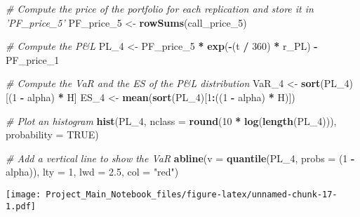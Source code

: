 \documentclass[]{article}
\newenvironment{Shaded}{\begin{snugshade}}{\end{snugshade}}
\newcommand{\CommentTok}[1]{\textcolor[rgb]{0.56,0.35,0.01}{\textit{#1}}}
\newcommand{\DataTypeTok}[1]{\textcolor[rgb]{0.13,0.29,0.53}{#1}}
\newcommand{\DecValTok}[1]{\textcolor[rgb]{0.00,0.00,0.81}{#1}}
\newcommand{\FloatTok}[1]{\textcolor[rgb]{0.00,0.00,0.81}{#1}}
\newcommand{\KeywordTok}[1]{\textcolor[rgb]{0.13,0.29,0.53}{\textbf{#1}}}
\newcommand{\NormalTok}[1]{#1}
\newcommand{\OperatorTok}[1]{\textcolor[rgb]{0.81,0.36,0.00}{\textbf{#1}}}
\newcommand{\OtherTok}[1]{\textcolor[rgb]{0.56,0.35,0.01}{#1}}
\newcommand{\StringTok}[1]{\textcolor[rgb]{0.31,0.60,0.02}{#1}}
\begin{document}
\begin{Shaded}
\begin{Highlighting}[]
\CommentTok{# Compute the price of the portfolio for each replication and store it in 'PF_price_5'}
\NormalTok{PF_price_}\DecValTok{5}\NormalTok{ <-}\StringTok{ }\KeywordTok{rowSums}\NormalTok{(call_price_}\DecValTok{5}\NormalTok{)}

\CommentTok{# Compute the P&L}
\NormalTok{PL_}\DecValTok{4}\NormalTok{ <-}\StringTok{ }\NormalTok{PF_price_}\DecValTok{5} \OperatorTok{*}\StringTok{ }\KeywordTok{exp}\NormalTok{(}\OperatorTok{-}\NormalTok{(t }\OperatorTok{/}\StringTok{ }\DecValTok{360}\NormalTok{) }\OperatorTok{*}\StringTok{ }\NormalTok{r_PL) }\OperatorTok{-}\StringTok{ }\NormalTok{PF_price_}\DecValTok{1}

\CommentTok{# Compute the VaR and the ES of the P&L distribution}
\NormalTok{VaR_}\DecValTok{4}\NormalTok{ <-}\StringTok{ }\KeywordTok{sort}\NormalTok{(PL_}\DecValTok{4}\NormalTok{)[(}\DecValTok{1} \OperatorTok{-}\StringTok{ }\NormalTok{alpha) }\OperatorTok{*}\StringTok{ }\NormalTok{H]}
\NormalTok{ES_}\DecValTok{4}\NormalTok{  <-}\StringTok{ }\KeywordTok{mean}\NormalTok{(}\KeywordTok{sort}\NormalTok{(PL_}\DecValTok{4}\NormalTok{)[}\DecValTok{1}\OperatorTok{:}\NormalTok{((}\DecValTok{1} \OperatorTok{-}\StringTok{ }\NormalTok{alpha) }\OperatorTok{*}\StringTok{ }\NormalTok{H)])}

\CommentTok{# Plot an histogram}
\KeywordTok{hist}\NormalTok{(PL_}\DecValTok{4}\NormalTok{, }\DataTypeTok{nclass =} \KeywordTok{round}\NormalTok{(}\DecValTok{10} \OperatorTok{*}\StringTok{ }\KeywordTok{log}\NormalTok{(}\KeywordTok{length}\NormalTok{(PL_}\DecValTok{4}\NormalTok{))), }\DataTypeTok{probability =} \OtherTok{TRUE}\NormalTok{)}

\CommentTok{# Add a vertical line to show the VaR}
\KeywordTok{abline}\NormalTok{(}\DataTypeTok{v   =} \KeywordTok{quantile}\NormalTok{(PL_}\DecValTok{4}\NormalTok{, }\DataTypeTok{probs =}\NormalTok{ (}\DecValTok{1} \OperatorTok{-}\StringTok{ }\NormalTok{alpha)),}
       \DataTypeTok{lty =} \DecValTok{1}\NormalTok{,}
       \DataTypeTok{lwd =} \FloatTok{2.5}\NormalTok{,}
       \DataTypeTok{col =} \StringTok{"red"}\NormalTok{)}
\end{Highlighting}
\end{Shaded}

\texttt{[image: Project\_Main\_Notebook\_files/figure-latex/unnamed-chunk-17-1.pdf]}
\end{document}
